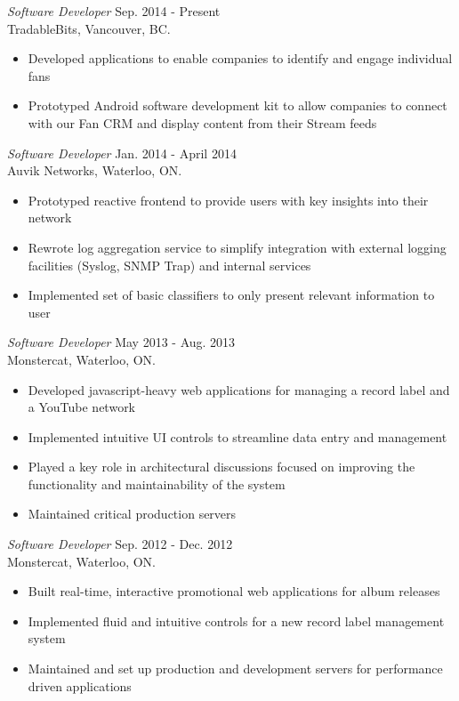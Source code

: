 \documentclass[margin]{res}
\begin{document}
\begin{resume}
{\sl Software Developer} \hfill Sep. 2014 - Present \\
TradableBits, Vancouver, BC.
\begin{itemize}  \itemsep -2pt %
			\item Developed applications to enable companies to identify and engage  individual fans
			\item Prototyped Android software development kit to allow companies to connect with our Fan CRM and display content from their Stream feeds
\end{itemize}

{\sl Software Developer} \hfill Jan. 2014 - April 2014 \\
Auvik Networks, Waterloo, ON.
\begin{itemize}  \itemsep -2pt %
  \item Prototyped reactive frontend to provide users with key insights into their network
	\item Rewrote log aggregation service to simplify integration with external logging facilities (Syslog, SNMP Trap) and internal services
  \item Implemented set of basic classifiers to only present relevant information to user
\end{itemize}

{\sl Software Developer} \hfill May 2013 - Aug. 2013 \\
Monstercat, Waterloo, ON.
\begin{itemize}  \itemsep -2pt %
  \item Developed javascript-heavy web applications for managing a record label and a YouTube network
  \item Implemented intuitive UI controls to streamline data entry and management
  \item Played a key role in architectural discussions focused on improving the functionality and maintainability of the system
  \item Maintained critical production servers
\end{itemize}

{\sl Software Developer} \hfill Sep. 2012 - Dec. 2012 \\
Monstercat, Waterloo, ON.
\begin{itemize}  \itemsep -2pt %
  \item Built real-time, interactive promotional web applications for album releases
  \item Implemented fluid and intuitive controls for a new record label management system
  \item Maintained and set up production and development servers for performance driven applications
\end{itemize}


\end{resume}
\end{document}
